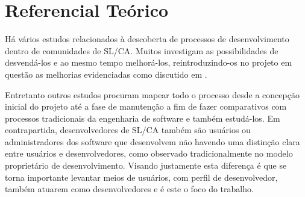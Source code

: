 % 
% 
% 
% 

\section{Referencial Teórico} \label{subsec:referencial}

Há vários estudos relacionados à descoberta de processos de desenvolvimento dentro de comunidades de SL/CA. Muitos investigam as possibilidades de desvendá-los e ao mesmo tempo melhorá-los, reintroduzindo-os no projeto em questão as melhorias evidenciadas como discutido  em \cite{experience}. 

Entretanto outros estudos procuram mapear todo o processo desde a concepção inicial do projeto até a fase de manutenção a fim de fazer comparativos com processos tradicionais da engenharia de software \cite{multimodal} e também estudá-los. 
Em contrapartida, desenvolvedores de SL/CA também são usuários ou administradores dos software que desenvolvem não havendo uma distinção clara entre usuários e desenvolvedores, como observado tradicionalmente no modelo proprietário de desenvolvimento. Visando justamente esta diferença é que se torna importante levantar meios de usuários, com perfil de desenvolvedor, também atuarem como desenvolvedores e é este o foco do trabalho.

